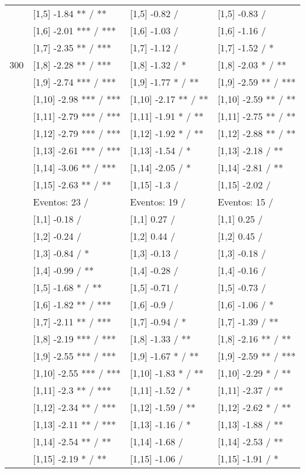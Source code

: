 \begin{table}
\begin{tabular}[t]{llll}
 & {}[1,5] -1.84 ** / ** & {}[1,5] -0.82  / & {}[1,5] -0.83  /\\
 & {}[1,6] -2.01 *** / *** & {}[1,6] -1.03  / & {}[1,6] -1.16  /\\
 & {}[1,7] -2.35 ** / *** & {}[1,7] -1.12  / & {}[1,7] -1.52  / *\\
300 & {}[1,8] -2.28 ** / *** & {}[1,8] -1.32  / * & {}[1,8] -2.03 * / **\\
\addlinespace
 & {}[1,9] -2.74 *** / *** & {}[1,9] -1.77 * / ** & {}[1,9] -2.59 ** / ***\\
 & {}[1,10] -2.98 *** / *** & {}[1,10] -2.17 ** / ** & {}[1,10] -2.59 ** / **\\
 & {}[1,11] -2.79 *** / *** & {}[1,11] -1.91 * / ** & {}[1,11] -2.75 ** / **\\
 & {}[1,12] -2.79 *** / *** & {}[1,12] -1.92 * / ** & {}[1,12] -2.88 ** / **\\
 & {}[1,13] -2.61 *** / *** & {}[1,13] -1.54  / * & {}[1,13] -2.18  / **\\
\addlinespace
 & {}[1,14] -3.06 ** / *** & {}[1,14] -2.05  / * & {}[1,14] -2.81  / **\\
 & {}[1,15] -2.63 ** / ** & {}[1,15] -1.3  / & {}[1,15] -2.02  /\\
 & Eventos:  23 / & Eventos:  19 / & Eventos:  15 /\\
 & {}[1,1] -0.18  / & {}[1,1] 0.27  / & {}[1,1] 0.25  /\\
 & {}[1,2] -0.24  / & {}[1,2] 0.44  / & {}[1,2] 0.45  /\\
\addlinespace
 & {}[1,3] -0.84  / * & {}[1,3] -0.13  / & {}[1,3] -0.18  /\\
 & {}[1,4] -0.99  / ** & {}[1,4] -0.28  / & {}[1,4] -0.16  /\\
 & {}[1,5] -1.68 * / ** & {}[1,5] -0.71  / & {}[1,5] -0.73  /\\
 & {}[1,6] -1.82 ** / *** & {}[1,6] -0.9  / & {}[1,6] -1.06  / *\\
 & {}[1,7] -2.11 ** / *** & {}[1,7] -0.94  / * & {}[1,7] -1.39  / **\\
\addlinespace
500 & {}[1,8] -2.19 *** / *** & {}[1,8] -1.33  / ** & {}[1,8] -2.16 ** / **\\
 & {}[1,9] -2.55 *** / *** & {}[1,9] -1.67 * / ** & {}[1,9] -2.59 ** / ***\\
 & {}[1,10] -2.55 *** / *** & {}[1,10] -1.83 * / ** & {}[1,10] -2.29 * / **\\
 & {}[1,11] -2.3 ** / *** & {}[1,11] -1.52  / * & {}[1,11] -2.37  / **\\
 & {}[1,12] -2.34 ** / *** & {}[1,12] -1.59  / ** & {}[1,12] -2.62 * / **\\
\addlinespace
 & {}[1,13] -2.11 ** / *** & {}[1,13] -1.16  / * & {}[1,13] -1.88  / **\\
 & {}[1,14] -2.54 ** / ** & {}[1,14] -1.68  / & {}[1,14] -2.53  / **\\
 & {}[1,15] -2.19 * / ** & {}[1,15] -1.06  / & {}[1,15] -1.91  / *\\
\bottomrule
\end{tabular}
\end{table}
